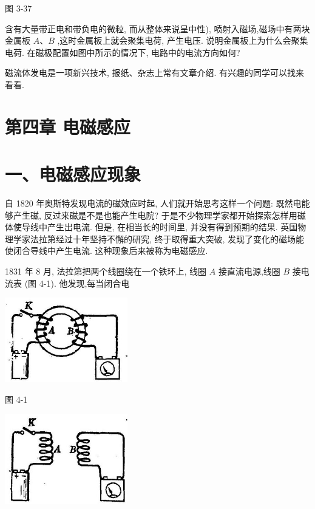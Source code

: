 \documentclass[10pt]{article}
\begin{document}
图 3-37

含有大量带正电和带负电的微粒, 而从整体来说呈中性), 喷射入磁场,磁场中有两块金属板 \(A\text{、}B\) ,这时金属板上就会聚集电荷, 产生电压. 说明金属板上为什么会聚集电荷. 在磁极配置如图中所示的情况下, 电路中的电流方向如何?

磁流体发电是一项新兴技术, 报纸、杂志上常有文章介绍. 有兴趣的同学可以找来看看.

\section*{第四章 电磁感应}

\section*{一、电磁感应现象}

自 1820 年奥斯特发现电流的磁效应时起, 人们就开始思考这样一个问题: 既然电能够产生磁, 反过来磁是不是也能产生电院? 于是不少物理学家都开始探索怎样用磁体使导线中产生出电流. 但是, 在相当长的时间里, 并没有得到预期的结果. 英国物理学家法拉第经过十年坚持不懈的研究, 终于取得重大突破, 发现了变化的磁场能使闭合导线中产生电流. 这种现象后来被称为电磁感应.

1831 年 8 月, 法拉第把两个线圈绕在一个铁环上, 线圈 \(A\) 接直流电源,线圈 \(B\) 接电流表 (图 4-1). 他发现,每当闭合电

\begin{center}
\includegraphics[max width=0.4\textwidth]{images/01913056-1f15-74d8-9184-9aab52c9d66b_133_443035.jpg}
\end{center}

图 4-1

\begin{center}
\includegraphics[max width=0.4\textwidth]{images/01913056-1f15-74d8-9184-9aab52c9d66b_133_860627.jpg}
\end{center}
\end{document}
